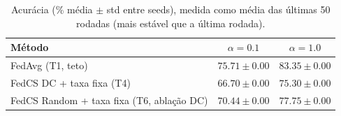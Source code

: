 \begin{table}[htbp]
\centering
\caption{Acurácia (\% média $\pm$ std entre seeds), medida como média das últimas 50 rodadas (mais estável que a última rodada).}
\label{tab:budget_results}
\begin{tabular}{lcc}
\toprule
Método & $\alpha=0.1$ & $\alpha=1.0$ \\
\midrule
FedAvg (T1, teto) & $75.71 \pm 0.00$ & $83.35 \pm 0.00$ \\
FedCS DC + taxa fixa (T4) & $66.70 \pm 0.00$ & $75.30 \pm 0.00$ \\
FedCS Random + taxa fixa (T6, ablação DC) & $70.44 \pm 0.00$ & $77.75 \pm 0.00$ \\
\bottomrule
\end{tabular}
\end{table}